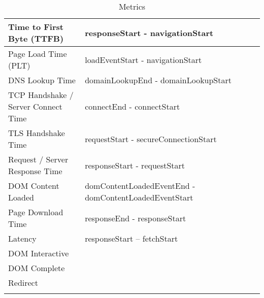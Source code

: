 \begin{center}
	\small
	\begin{longtable}{ | p{0.3\linewidth} | p{0.7\linewidth} | }
	\hline
	Time to First Byte (TTFB) & responseStart - navigationStart \\
	\hline
	Page Load Time (PLT) & loadEventStart - navigationStart \\
	\hline
	DNS Lookup Time & domainLookupEnd - domainLookupStart \\
	\hline
	TCP Handshake / Server Connect Time & connectEnd - connectStart \\
	\hline
	TLS Handshake Time & requestStart - secureConnectionStart \\
	\hline
	Request / Server Response Time & responseStart - requestStart \\
	\hline
	DOM Content Loaded & domContentLoadedEventEnd - domContentLoadedEventStart \\
	\hline
	Page Download Time & responseEnd - responseStart \\
	\hline
	Latency & responseStart – fetchStart \\
	\hline
	DOM Interactive & \\
	\hline
	DOM Complete & \\
	\hline
	Redirect & \\
	\hline
	\caption{Metrics} %
	\label{tab:navigationtiming_metrics}
	\end{longtable}
\end{center}















